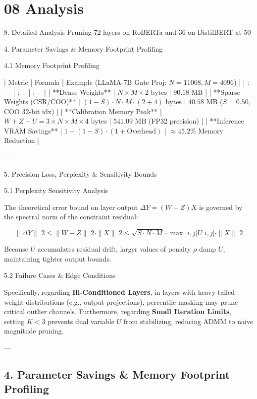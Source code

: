\section{08 Analysis}

 8. Detailed Analysis
Pruning 72 layers on RoBERTa and 36 on DistilBERT at 50%


 4. Parameter Savings \& Memory Footprint Profiling


 4.1 Memory Footprint Profiling

| Metric | Formula | Example (LLaMA-7B Gate Proj: $N=11008, M=4096$) |
| :--- | :--- | :--- |
| **Dense Weights** | $N \times M \times 2 \text{ bytes}$ | $90.18 \text{ MB}$ |
| **Sparse Weights (CSR/COO)** | $(1 - S) \cdot N \cdot M \cdot (2 + 4) \text{ bytes}$ | $40.58 \text{ MB}$ ($S=0.50$, COO 32-bit idx) |
| **Calibration Memory Peak** | $W + Z + U = 3 \times N \times M \times 4 \text{ bytes}$ | $541.09 \text{ MB}$ (FP32 precision) |
| **Inference VRAM Savings** | $1 - (1 - S) \cdot (1 + \text{Overhead})$ | $\approx 45.2\%$ Memory Reduction |

---


 5. Precision Loss, Perplexity \& Sensitivity Bounds


 5.1 Perplexity Sensitivity Analysis

The theoretical error bound on layer output $\Delta Y = (W - Z) X$ is governed by the spectral norm of the constraint residual:

$$\| \Delta Y \|\_2 \le \| W - Z \|\_2 \cdot \| X \|\_2 \le \sqrt{S \cdot N \cdot M} \cdot \max\_{i,j} |U\_{i,j}| \cdot \| X \|\_2$$

Because $U$ accumulates residual drift, larger values of penalty $\rho$ damp $U$, maintaining tighter output bounds.

 5.2 Failure Cases \& Edge Conditions

Specifically, regarding \textbf{Ill-Conditioned Layers}, in layers with heavy-tailed weight distributions (e.g., output projections), percentile masking may prune critical outlier channels. Furthermore, regarding \textbf{Small Iteration Limits}, setting $K < 3$ prevents dual variable $U$ from stabilizing, reducing ADMM to naive magnitude pruning.


---



\subsection{4. Parameter Savings \& Memory Footprint Profiling}
